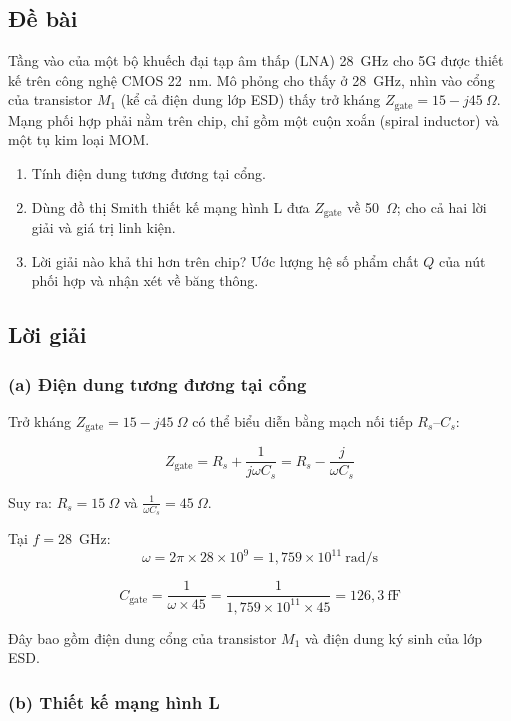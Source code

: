 \documentclass[12pt,a4paper]{article}
\begin{document}
\subsection{Đề bài}
Tầng vào của một bộ khuếch đại tạp âm thấp (LNA) 28~GHz cho 5G được thiết kế trên công nghệ CMOS 22~nm. Mô phỏng cho thấy ở 28~GHz, nhìn vào cổng của transistor $M_1$ (kể cả điện dung lớp ESD) thấy trở kháng $Z_{\text{gate}} = 15 - j45~\Omega$. Mạng phối hợp phải nằm trên chip, chỉ gồm một cuộn xoắn (spiral inductor) và một tụ kim loại MOM.

\begin{enumerate}[label=(\alph*)]
    \item Tính điện dung tương đương tại cổng.
    \item Dùng đồ thị Smith thiết kế mạng hình L đưa $Z_{\text{gate}}$ về 50~$\Omega$; cho cả hai lời giải và giá trị linh kiện.
    \item Lời giải nào khả thi hơn trên chip? Ước lượng hệ số phẩm chất $Q$ của nút phối hợp và nhận xét về băng thông.
\end{enumerate}

\subsection{Lời giải}

\subsubsection{(a) Điện dung tương đương tại cổng}

Trở kháng $Z_{\text{gate}} = 15 - j45~\Omega$ có thể biểu diễn bằng mạch nối tiếp $R_s$--$C_s$:

\[
Z_{\text{gate}} = R_s + \frac{1}{j\omega C_s} = R_s - \frac{j}{\omega C_s}
\]

Suy ra: $R_s = 15~\Omega$ và $\frac{1}{\omega C_s} = 45~\Omega$.

Tại $f = 28$~GHz:
\[
\omega = 2\pi \times 28 \times 10^9 = 1{,}759 \times 10^{11}~\text{rad/s}
\]

\[
\boxed{C_{\text{gate}} = \frac{1}{\omega \times 45} = \frac{1}{1{,}759 \times 10^{11} \times 45} = 126{,}3~\text{fF}}
\]

Đây bao gồm điện dung cổng của transistor $M_1$ và điện dung ký sinh của lớp ESD.

\subsubsection{(b) Thiết kế mạng hình L}
\end{document}
